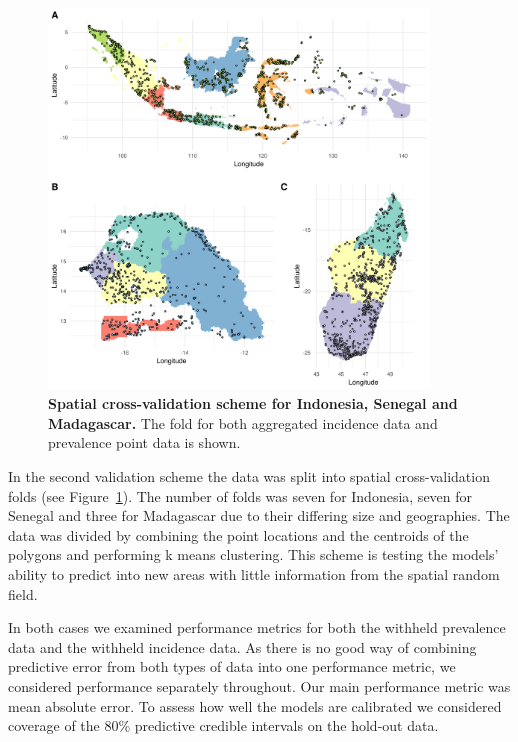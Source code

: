 \documentclass[10pt,letterpaper]{article}
\begin{document}
\begin{figure}[!h]
\centering

\includegraphics[width = 0.9\textwidth]{figures/spatial_crossvalidation_full.png} %

\caption{{\bf Spatial cross-validation scheme for Indonesia, Senegal and Madagascar.} The fold for both aggregated incidence data and prevalence point data is shown.}
\label{fig:cv_spatial}
\end{figure}



In the second validation scheme the data was split into spatial cross-validation folds (see Figure~\ref{fig:cv_spatial}).
The number of folds was seven for Indonesia, seven for Senegal and three for Madagascar due to their differing size and geographies.
The data was divided by combining the point locations and the centroids of the polygons and performing k means clustering.
This scheme is testing the models' ability to predict into new areas with little information from the spatial random field.

In both cases we examined performance metrics for both the withheld prevalence data and the withheld incidence data.
As there is no good way of combining predictive error from both types of data into one performance metric, we considered performance separately throughout.
Our main performance metric was mean absolute error.
To assess how well the models are calibrated we considered coverage of the 80\% predictive credible intervals on the hold-out data.
\end{document}
